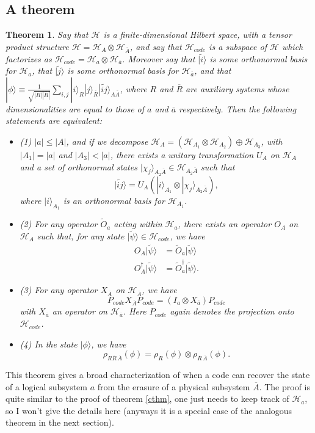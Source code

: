 \documentclass[12pt]{article}
\newcommand{\be}{\begin{equation}}
\newcommand{\ee}{\end{equation}}
\newcommand{\bi}{\begin{itemize}}
\newcommand{\ei}{\end{itemize}}
\newcommand{\ran}{\rangle}
\newcommand{\wt}{\widetilde}
\newcommand{\Hh}{\mathcal{H}}
\newcommand{\HA}{\mathcal{H}_A}
\newcommand{\HAb}{\mathcal{H}_{\ol{A}}}
\newcommand{\Ab}{\ol{A}}
\newcommand{\ab}{\ol{a}}
\newcommand{\Ha}{\mathcal{H}_{a}}
\newcommand{\Hab}{\mathcal{H}_{\ol{a}}}
\newcommand{\Hc}{\mathcal{H}_{code}}
\newcommand{\ol}{\overline}
\newcommand{\Pc}{P_{code}}
\newtheorem{thm}{Theorem}[section]
\begin{document}
\subsection{A theorem}
\begin{thm}\label{sthm}
Say that $\Hh$ is a finite-dimensional Hilbert space, with a tensor product structure $\Hh=\HA\otimes\HAb$, and say that $\Hc$ is a subspace of $\Hh$ which factorizes as $\Hc=\Ha\otimes\Hab$.  Moreover say that $|\wt{i}\ran$ is some orthonormal basis for $\Ha$, that $|\wt{j}\ran$ is some orthonormal basis for $\Hab$, and that $|\phi\ran\equiv \frac{1}{\sqrt{|R||\ol{R}|}} \sum_{i,j} |i\ran_R|j\ran_{\ol{R}}|\wt{ij}\ran_{A\ol{A}}$, where $R$ and $\ol{R}$ are auxiliary systems whose dimensionalities are equal to those of $a$ and $\ab$ respectively.  Then the following statements are equivalent:
\bi
\item[(1)] $|a|\leq |A|$, and if we decompose $\HA=(\Hh_{A_1}\otimes\Hh_{A_2})\oplus \Hh_{A_3}$, with $|A_1|=|a|$ and $|A_3|<|a|$, there exists a unitary transformation $U_A$ on $\HA$ and a set of orthonormal states $|\chi_j\ran_{A_2\ol{A}}\in \Hh_{A_2\ol{A}}$ such that
\be
|\wt{ij}\ran=U_A\left(|i\ran_{A_1}\otimes |\chi_j\ran_{A_2\ol{A}}\right),
\ee
where $|i\ran_{A_1}$ is an orthonormal basis for $\Hh_{A_1}$.

\item[(2)] For any operator $\wt{O}_a$ acting within $\Ha$, there exists an operator $O_A$ on $\HA$ such that, for any state $|\wt{\psi}\ran\in \Hc$, we have
\begin{align}\nonumber
O_A|\wt{\psi}\ran&=\wt{O}_a|\wt{\psi}\ran\\
O_A^\dagger|\wt{\psi}\ran&=\wt{O}^\dagger_a|\wt{\psi}\ran.
\end{align} 


\item[(3)] For any operator $X_{\ol{A}}$ on $\HAb$, we have
\be
P_{code}X_{\ol{A}}P_{code}=(I_a\otimes X_{\ab})\Pc
\ee
with $X_{\ab}$ an operator on $\Hab$.  Here $P_{code}$ again denotes the projection onto $\Hc$. 
\item[(4)] In the state $|\phi\ran$, we have
\be
\rho_{R\ol{R}\,\Ab}(\phi)=\rho_R(\phi)\otimes \rho_{\ol{R}\,\Ab}(\phi).
\ee

\ei
\end{thm}
This theorem gives a broad characterization of when a code can recover the state of a logical subsystem $a$ from the erasure of a physical subsystem $\Ab$.  The proof is quite similar to the proof of theorem \ref{cthm}, one just needs to keep track of $\Ha$, so I won't give the details here (anyways it is a special case of the analogous theorem in the next section).
\end{document}
